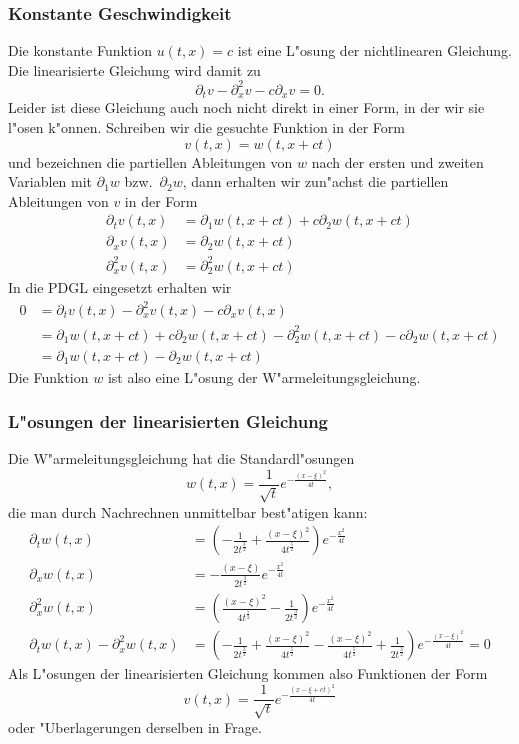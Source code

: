 \subsubsection{Konstante Geschwindigkeit}
Die konstante Funktion $u(t,x)=c$ ist eine L"osung der nichtlinearen
Gleichung. Die linearisierte Gleichung wird damit zu
$$
\partial_tv
-\partial_x^2v
-c\partial_xv=0.
$$
Leider ist diese Gleichung auch noch nicht direkt in einer Form,
in der wir sie l"osen k"onnen. Schreiben wir die gesuchte Funktion
in der Form
$$v(t,x)=w(t,x+ct)$$
und bezeichnen die partiellen Ableitungen von $w$ nach der ersten
und zweiten Variablen mit $\partial_1w$ bzw.~$\partial_2w$, dann
erhalten wir zun"achst die partiellen Ableitungen von $v$
in der Form
\begin{align*}
\partial_t v(t,x)&=\partial_1w(t,x+ct)+c\partial_2w(t,x+ct)
\\
\partial_x v(t,x)&=\partial_2w(t,x+ct)
\\
\partial_x^2v(t,x)&=\partial_2^2w(t,x+ct)
\end{align*}
In die PDGL eingesetzt erhalten wir
\begin{align*}
0&=
\partial_t v(t,x)
-\partial_x^2v(t,x)
-c\partial_x v(t,x)
\\
&=
\partial_1w(t,x+ct)+c\partial_2w(t,x+ct)
-\partial_2^2w(t,x+ct)
-c\partial_2w(t,x+ct)
\\
&=\partial_1w(t,x+ct)-\partial_2w(t,x+ct)
\end{align*}
Die Funktion $w$ ist also eine L"osung der W"armeleitungsgleichung.

\subsubsection{L"osungen der linearisierten Gleichung}
Die W"armeleitungsgleichung hat die Standardl"osungen
$$w(t,x)=\frac1{\sqrt{t}}e^{-\frac{(x-\xi)^2}{4t}},$$
die man durch Nachrechnen unmittelbar best"atigen kann:
\begin{align*}
\partial_t w(t,x)
&=
\left(
-\frac1{2t^{\frac32}}
+\frac{(x-\xi)^2}{4t^{\frac52}}
\right)e^{-\frac{x^2}{4t}}
\\
\partial_x w(t,x)
&=
-\frac{(x-\xi)}{2t^{\frac32}}
e^{-\frac{x^2}{4t}}
\\
\partial_x^2w(t,x)
&=
\left(
\frac{(x-\xi)^2}{4t^{\frac52}}
-\frac{1}{2t^{\frac32}}
\right)e^{-\frac{x^2}{4t}}
\\
\partial_tw(t,x)-\partial_x^2w(t,x)
&=
\left(
-\frac1{2t^{\frac32}}
+\frac{(x-\xi)^2}{4t^{\frac52}}
-\frac{(x-\xi)^2}{4t^{\frac52}}
+\frac{1}{2t^{\frac32}}
\right)e^{-\frac{(x-\xi)^2}{4t}}=0
\end{align*}
Als L"osungen der linearisierten Gleichung kommen also Funktionen der
Form
$$v(t,x)=\frac1{\sqrt{t}}e^{-\frac{(x-\xi+ct)^2}{4t}}$$
oder "Uberlagerungen derselben in Frage.

